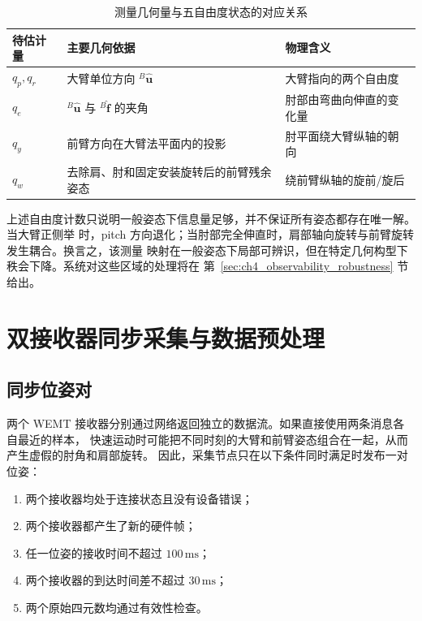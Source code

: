 \begin{table}[htbp]
  \centering
  \caption{测量几何量与五自由度状态的对应关系}
  \label{tab:ch4_measurement_to_joint}
  \begin{tabularx}{\linewidth}{@{}lXX@{}}
    \toprule
    待估计量 & 主要几何依据 & 物理含义 \\
    \midrule
    $q_p,q_r$ & 大臂单位方向 ${}^{B}\hat{\boldsymbol u}$ & 大臂指向的两个自由度 \\
    $q_e$ & ${}^{B}\hat{\boldsymbol u}$ 与 ${}^{B}\hat{\boldsymbol f}$ 的夹角
      & 肘部由弯曲向伸直的变化量 \\
    $q_y$ & 前臂方向在大臂法平面内的投影 & 肘平面绕大臂纵轴的朝向 \\
    $q_w$ & 去除肩、肘和固定安装旋转后的前臂残余姿态
      & 绕前臂纵轴的旋前/旋后 \\
    \bottomrule
  \end{tabularx}
\end{table}

上述自由度计数只说明一般姿态下信息量足够，并不保证所有姿态都存在唯一解。当大臂正侧举
时，pitch 方向退化；当肘部完全伸直时，肩部轴向旋转与前臂旋转发生耦合。换言之，该测量
映射在一般姿态下局部可辨识，但在特定几何构型下秩会下降。系统对这些区域的处理将在
第~\ref{sec:ch4_observability_robustness} 节给出。

\section{双接收器同步采集与数据预处理}
\label{sec:ch4_synchronized_acquisition}

\subsection{同步位姿对}
\label{subsec:ch4_synchronized_pose_pairs}

两个 WEMT 接收器分别通过网络返回独立的数据流。如果直接使用两条消息各自最近的样本，
快速运动时可能把不同时刻的大臂和前臂姿态组合在一起，从而产生虚假的肘角和肩部旋转。
因此，采集节点只在以下条件同时满足时发布一对位姿：
\begin{enumerate}[label=\arabic*)]
  \item 两个接收器均处于连接状态且没有设备错误；
  \item 两个接收器都产生了新的硬件帧；
  \item 任一位姿的接收时间不超过 $100\,\mathrm{ms}$；
  \item 两个接收器的到达时间差不超过 $30\,\mathrm{ms}$；
  \item 两个原始四元数均通过有效性检查。
\end{enumerate}

